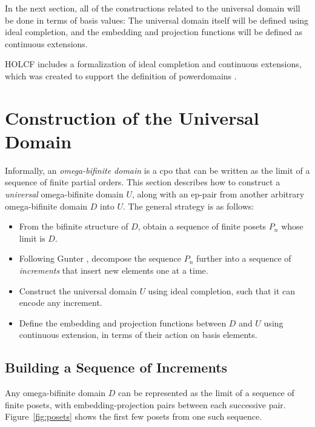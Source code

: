 \documentclass{llncs}
\begin{document}
In the next section, all of the constructions related to the universal
domain will be done in terms of basis values: The universal domain
itself will be defined using ideal completion, and the embedding and
projection functions will be defined as continuous extensions.

HOLCF includes a formalization of ideal completion and continuous
extensions, which was created to support the definition of
powerdomains \cite{huffman08powerdomain}.


\section{\label{sec:construction}Construction of the Universal Domain}

Informally, an \emph{omega-bifinite domain} is a cpo that can be
written as the limit of a sequence of finite partial orders.  This
section describes how to construct a \emph{universal} omega-bifinite
domain $U$, along with an ep-pair from another arbitrary
omega-bifinite domain $D$ into $U$.  The general strategy is as
follows:
\begin{itemize}
\item From the bifinite structure of $D$, obtain a sequence of finite
  posets $P_n$ whose limit is $D$.
\item Following Gunter \cite{gunter87universal}, decompose the
  sequence $P_n$ further into a sequence of \emph{increments} that
  insert new elements one at a time.
\item Construct the universal domain $U$ using ideal completion, such
  that it can encode any increment.
\item Define the embedding and projection functions between $D$ and
  $U$ using continuous extension, in terms of their action on basis
  elements.
\end{itemize}

\subsection{Building a Sequence of Increments}

Any omega-bifinite domain $D$ can be represented as the limit of a
sequence of finite posets, with embedding-projection pairs between
each successive pair.  Figure~\ref{fig:posets} shows the first few
posets from one such sequence.
\end{document}
